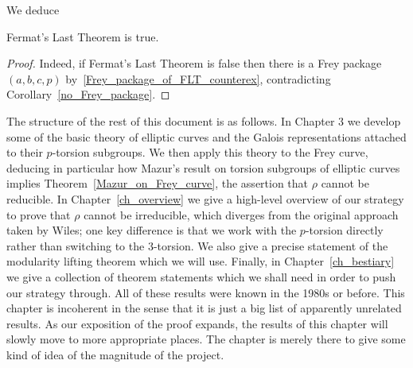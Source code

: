 We deduce

\begin{corollary}\label{FLT}\leanok Fermat's Last Theorem is true.\end{corollary}
\begin{proof}\leanok
Indeed, if Fermat's Last Theorem is false then there is a Frey package $(a,b,c,p)$ by~\ref{Frey_package_of_FLT_counterex}, contradicting Corollary~\ref{no_Frey_package}.
\end{proof}

The structure of the rest of this document is as follows. In Chapter 3 we develop some of the basic theory of elliptic curves and the Galois representations attached to their $p$-torsion subgroups. We then apply this theory to the Frey curve, deducing in particular how Mazur's result on torsion subgroups of elliptic curves implies Theorem~\ref{Mazur_on_Frey_curve}, the assertion that $\rho$ cannot be reducible. In Chapter~\ref{ch_overview} we give a high-level overview of our strategy to prove that $\rho$ cannot be irreducible, which diverges from the original approach taken by Wiles; one key difference is that we work with the $p$-torsion directly rather than switching to the 3-torsion. We also give a precise statement of the modularity lifting theorem which we will use. Finally, in Chapter~\ref{ch_bestiary} we give a collection of theorem statements which we shall need in order to push our strategy through. All of these results were known in the 1980s or before. This chapter is incoherent in the sense that it is just a big list of apparently unrelated results. As our exposition of the proof expands, the results of this chapter will slowly move to more appropriate places. The chapter is merely there to give some kind of idea of the magnitude of the project.
